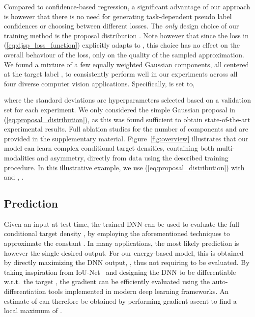 \documentclass[runningheads]{llncs}
\begin{document}
Compared to confidence-based regression, a significant advantage of our approach is however that there is no need for generating task-dependent pseudo label confidences or choosing between different losses. The \emph{only} design choice of our training method is the proposal distribution . Note however that since the loss  in (\ref{eq:djsp_loss_function}) explicitly adapts to , this choice has no effect on the overall behaviour of the loss, only on the quality of the sampled approximation. We found a mixture of a few equally weighted Gaussian components, all centered at the target label , to consistently perform well in our experiments across all four diverse computer vision applications. Specifically,  is set to,

where the standard deviations  are hyperparameters selected based on a validation set for each experiment. We only considered the simple Gaussian proposal in (\ref{eq:proposal_distribution}), as this was found sufficient to obtain state-of-the-art experimental results. Full ablation studies for the number of components  and  are provided in the supplementary material. Figure~\ref{fig:overview} illustrates that our model  can learn complex conditional target densities, containing both multi-modalities and asymmetry, directly from data using the described training procedure. In this illustrative example, we use (\ref{eq:proposal_distribution}) with  and , .




\subsection{Prediction}
\label{DCTDs:prediction}

Given an input  at test time, the trained DNN  can be used to evaluate the full conditional target density , by employing the aforementioned techniques to approximate the constant . In many applications, the most likely prediction  is however the single desired output. For our energy-based model, this is obtained by directly maximizing the DNN output, , thus not requiring  to be evaluated. By taking inspiration from IoU-Net~\cite{jiang2018acquisition} and designing the DNN  to be differentiable w.r.t.\ the target , the gradient  can be efficiently evaluated using the auto-differentiation tools implemented in modern deep learning frameworks. An estimate of  can therefore be obtained by performing gradient ascent to find a local maximum of . 
\end{document}
